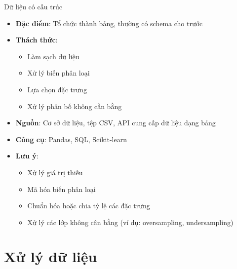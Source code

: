\documentclass{beamer}
\begin{document}
\begin{frame}{Dữ liệu có cấu trúc}
    \begin{itemize}
        \item \textbf{Đặc điểm}: Tổ chức thành bảng, thường có schema cho trước
        \item \textbf{Thách thức}:
        \begin{itemize}
            \item Làm sạch dữ liệu
            \item Xử lý biến phân loại
            \item Lựa chọn đặc trưng
            \item Xử lý phân bố không cần bằng
        \end{itemize}
        \item \textbf{Nguồn}: Cơ sở dữ liệu, tệp CSV, API cung cấp dữ liệu dạng bảng
        \item \textbf{Công cụ}: Pandas, SQL, Scikit-learn
        \item \textbf{Lưu ý}:
        \begin{itemize}
            \item Xử lý giá trị thiếu
            \item Mã hóa biến phân loại
            \item Chuẩn hóa hoặc chia tỷ lệ các đặc trưng
            \item Xử lý các lớp không cân bằng (ví dụ: oversampling, undersampling)
        \end{itemize}
    \end{itemize}
\end{frame}

\section{Xử lý dữ liệu}
\end{document}
